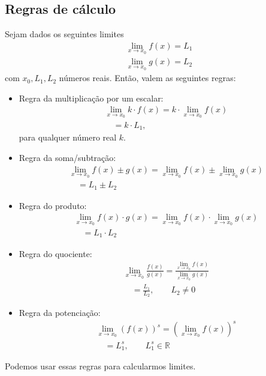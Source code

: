 \subsection{Regras de cálculo}

Sejam dados os seguintes limites
\begin{align}
  & \lim_{x\to x_0} f(x) = L_1 \\
  & \lim_{x\to x_0} g(x) = L_2
\end{align}
com $x_0, L_1, L_2$ números reais. Então, valem as seguintes regras:
\begin{itemize}
\item Regra da multiplicação por um escalar:
  \begin{align}
    & \lim_{x\to x_0} k\cdot f(x) = k\cdot \lim_{x\to x_0} f(x)\\
    & \text{}\quad = k\cdot L_1,
  \end{align}
  para qualquer número real $k$.
\item Regra da soma/subtração:
  \begin{align}
    & \lim_{x\to x_0} f(x) \pm g(x) = \lim_{x\to x_0} f(x) \pm \lim_{x\to x_0} g(x) \\
    & \text{}\quad = L_1 \pm L_2
  \end{align}
\item Regra do produto:
  \begin{align}
    & \lim_{x\to x_0} f(x) \cdot g(x) = \lim_{x\to x_0} f(x) \cdot \lim_{x\to x_0} g(x) \\
    & \text{}\quad = L_1 \cdot L_2
  \end{align}
\item Regra do quociente:
  \begin{align}
    & \lim_{x\to x_0} \frac{f(x)}{g(x)} = \frac{\lim_{x\to x_0} f(x)}{\lim_{x\to x_0} g(x)} \\
    & \text{}\quad = \frac{L_1}{L_2},\qquad L_2\neq 0
  \end{align}
\item Regra da potenciação:
  \begin{align}
    & \lim_{x\to x_0} (f(x))^s = \left(\lim_{x\to x_0} f(x)\right)^s\\
    & \text{}\quad = L_1^s,\qquad L_1^s\in\mathbb{R}
  \end{align}
\end{itemize}

Podemos usar essas regras para calcularmos limites.

